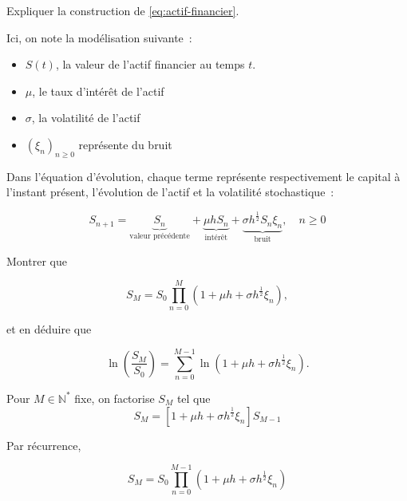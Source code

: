 \documentclass[answers, 10pt]{exam}
\begin{document}
\begin{questions}
	\question 
	Expliquer la construction de \cref{eq:actif-financier}.

	\begin{solutionorbox}
		Ici, on note la modélisation suivante~:
		
		\begin{itemize}
			\item $S(t)$, la valeur de l'actif financier au temps $t$.
			\item $\mu$, le taux d'intérêt de l'actif
			\item $\sigma$, la volatilité de l'actif
			\item $(\xi_n)_{n\geq 0}$ représente du bruit
		\end{itemize}

		Dans l'équation d'évolution, chaque terme représente
		respectivement le capital à l'instant présent, l'évolution de
		l'actif et la volatilité stochastique~:

		\begin{equation*}
			S_{n+1} = \underbrace{S_n}_{\text{valeur précédente}} 
			+ \underbrace{\mu h S_n}_{\text{intérêt}} 
			+ \underbrace{\sigma h^{ \frac{1}{2} } S_n \xi_n}_{\text{bruit}}
			,\quad n \geq 0 
		\end{equation*}

	\end{solutionorbox}

	\question
	Montrer que

	\begin{equation*}
		S_M = S_0 \prod_{n=0}^{M} (1 + \mu h + \sigma h^{\frac{1}{2}} \xi_n
)		,
	\end{equation*}

	et en déduire que 

	\begin{equation*}
		\ln \left( \frac{S_M}{S_0} \right) = \sum_{n=0}^{M-1} \ln(1 + \mu h + \sigma h^{\frac{1}{2}} \xi_n).
	\end{equation*}

	\begin{solutionorbox}
		Pour $M\in \mathbb{N}^*$ fixe, on factorise $S_M$ tel que 
		\begin{equation*}
			S_M = \left[ 1 + \mu h + \sigma h^{\frac{1}{2}} \xi_{n}\right] S_{M-1}
		\end{equation*}	

		Par récurrence,

		\begin{equation*}
			S_M = S_0 \prod_{n=0}^{M-1}  (1 + \mu h + \sigma h^{\frac{1}{2}}\xi_n
) 		\end{equation*}
		

\end{solutionorbox}
\end{questions}
\end{document}
